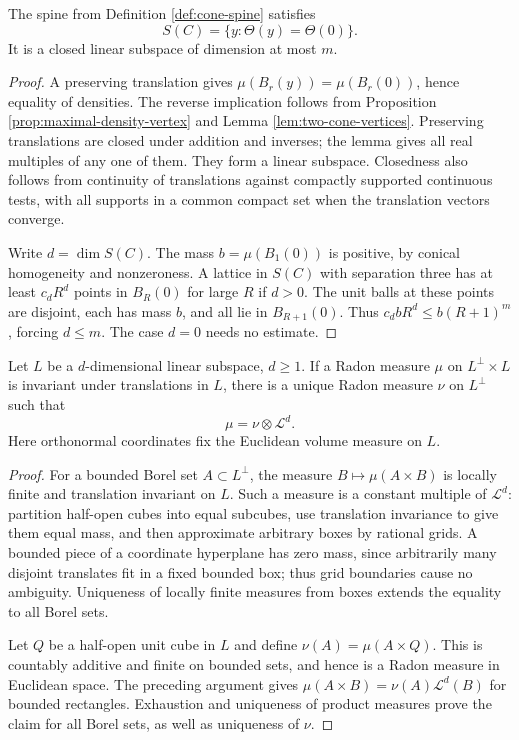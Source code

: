 \begin{proposition}\label{prop:spine-maximal-density}
The spine from Definition \ref{def:cone-spine} satisfies
\[
 S(C)=\{y:\Theta(y)=\Theta(0)\}.
\]
It is a closed linear subspace of dimension at most $m$.
\end{proposition}
\begin{proof}
A preserving translation gives $\mu(B_r(y))=\mu(B_r(0))$, hence equality of densities. The reverse implication follows from Proposition \ref{prop:maximal-density-vertex} and Lemma \ref{lem:two-cone-vertices}. Preserving translations are closed under addition and inverses; the lemma gives all real multiples of any one of them. They form a linear subspace. Closedness also follows from continuity of translations against compactly supported continuous tests, with all supports in a common compact set when the translation vectors converge.

Write $d=\dim S(C)$. The mass $b=\mu(B_1(0))$ is positive, by conical homogeneity and nonzeroness. A lattice in $S(C)$ with separation three has at least $c_dR^d$ points in $B_R(0)$ for large $R$ if $d>0$. The unit balls at these points are disjoint, each has mass $b$, and all lie in $B_{R+1}(0)$. Thus $c_dbR^d\leq b(R+1)^m$, forcing $d\leq m$. The case $d=0$ needs no estimate.
\end{proof}

\begin{lemma}\label{lem:translation-measure-product}
Let $L$ be a $d$-dimensional linear subspace, $d\geq1$. If a Radon measure $\mu$ on $L^\perp\times L$ is invariant under translations in $L$, there is a unique Radon measure $\nu$ on $L^\perp$ such that
\[
 \mu=\nu\otimes\mathcal L^d.
\]
Here orthonormal coordinates fix the Euclidean volume measure on $L$.
\end{lemma}
\begin{proof}
For a bounded Borel set $A\subset L^\perp$, the measure $B\mapsto\mu(A\times B)$ is locally finite and translation invariant on $L$. Such a measure is a constant multiple of $\mathcal L^d$: partition half-open cubes into equal subcubes, use translation invariance to give them equal mass, and then approximate arbitrary boxes by rational grids. A bounded piece of a coordinate hyperplane has zero mass, since arbitrarily many disjoint translates fit in a fixed bounded box; thus grid boundaries cause no ambiguity. Uniqueness of locally finite measures from boxes extends the equality to all Borel sets.

Let $Q$ be a half-open unit cube in $L$ and define $\nu(A)=\mu(A\times Q)$. This is countably additive and finite on bounded sets, and hence is a Radon measure in Euclidean space. The preceding argument gives $\mu(A\times B)=\nu(A)\mathcal L^d(B)$ for bounded rectangles. Exhaustion and uniqueness of product measures prove the claim for all Borel sets, as well as uniqueness of $\nu$.
\end{proof}

